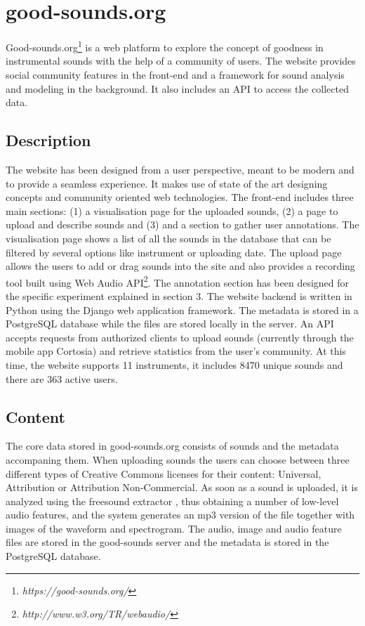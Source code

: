 \documentclass{article}
\begin{document}
\section{good-sounds.org}\label{sec:goodsounds}
Good-sounds.org\footnote{\textit{https://good-sounds.org/}} is a web platform to explore the concept of goodness in instrumental sounds with the help of a community of users. The website provides social community features in the front-end and a framework for sound analysis and modeling in the background. It also includes an API to access the collected data.

\subsection{Description} 
The website has been designed from a user perspective, meant to be modern and to provide a seamless experience. It makes use of state of the art designing concepts and community oriented web technologies. The front-end includes three main sections: (1) a visualisation page for the uploaded sounds, (2) a page to  upload and describe sounds and (3) and a section to gather user annotations. The visualisation page shows a list of all the sounds in the database that can be filtered by several options like instrument or uploading date. The upload page allows the users to add or drag sounds into the site and also provides a recording tool built using Web Audio API\footnote{\textit{http://www.w3.org/TR/webaudio/}}. The annotation section has been designed for the specific experiment explained in section 3. 
The website backend is written in Python using the Django web application framework. The metadata is stored in a PostgreSQL database while the files are stored locally in the server. An API accepts requests from authorized clients to upload sounds (currently through the mobile app Cortosia) and retrieve statistics from the user’s community. 
At this time, the website supports 11 instruments, it includes 8470 unique sounds and there are 363 active users. 

\subsection{Content}
The core data stored in good-sounds.org consists of sounds and the metadata accompaning them. When uploading sounds the users can choose between three different types of Creative Commons licenses for their content: Universal, Attribution or Attribution Non-Commercial. As soon as a sound is uploaded, it is analyzed using the freesound extractor \cite{02}, thus obtaining a number of low-level audio features, and the system generates an mp3 version of the file together with images of the waveform and spectrogram. The audio,  image and audio feature files are stored in the good-sounds server and the metadata is stored in the PostgreSQL database. 
\end{document}
